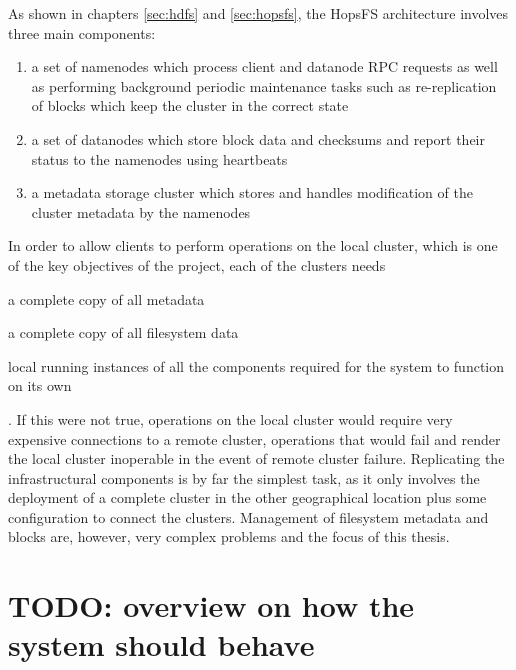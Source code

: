 As shown in chapters \ref{sec:hdfs} and \ref{sec:hopsfs}, the HopsFS architecture involves three main components:
\begin{enumerate}
    \item a set of namenodes which process client and datanode RPC requests as well as performing background periodic maintenance tasks such as re-replication of blocks which keep the cluster  in the correct state
    \item a set of datanodes which store block data and checksums and report their status to the namenodes using heartbeats
    \item a metadata storage cluster which stores and handles modification of the cluster metadata by the namenodes
\end{enumerate}
In order to allow clients to perform operations on the local cluster, which is one of the key objectives of the project, each of the clusters needs
\begin{inparaenum}
    \item a complete copy of all metadata
    \item a complete copy of all filesystem data
    \item local running instances of all the components required for the system to function on its own
\end{inparaenum}.
If this were not true, operations on the local cluster would require very expensive connections to a remote cluster, operations that would fail and render the local cluster inoperable in the event of remote cluster failure.
Replicating the infrastructural components is by far the simplest task, as it only involves the deployment of a complete cluster in the other geographical location plus some configuration to connect the clusters.
Management of filesystem metadata and blocks are, however, very complex problems and the focus of this thesis.

\section{TODO: overview on how the system should behave}